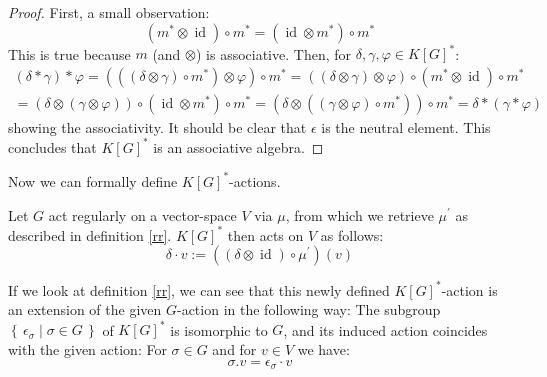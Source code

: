 \begin{proof}
  First, a small observation:
  \begin{equation}
    \left(m^\ast \otimes \operatorname{id} \right) \circ m^\ast = \left( \operatorname{id} \otimes m^\ast \right) \circ m^\ast
  \end{equation}
  This is true because $m$ (and $ \otimes $) is associative.
  Then, for $\delta, \gamma, \varphi \in K \left\lbrack G \right\rbrack^\ast$:
  \begin{equation}
    \begin{aligned}
      \left( \delta \ast \gamma \right) \ast \varphi
      = \left( \left( \left( \delta \otimes \gamma \right) \circ m^\ast \right) \otimes \varphi \right) \circ m^\ast
      = \left( (\delta \otimes \gamma) \otimes \varphi \right) \circ \left( m^\ast \otimes \operatorname{id} \right) \circ m^\ast \\
      = \left( \delta \otimes (\gamma \otimes \varphi) \right) \circ \left( \operatorname{id} \otimes m^\ast \right) \circ m^\ast
      = \left( \delta \otimes \left( \left( \gamma \otimes \varphi \right) \circ m^\ast \right) \right) \circ m^\ast
      = \delta \ast \left( \gamma \ast \varphi \right)
    \end{aligned}
  \end{equation}
  showing the associativity.
  It should be clear that $\epsilon$ is the neutral element.
  This concludes that $K \left\lbrack G \right\rbrack^\ast$ is an associative algebra.
\end{proof}

Now we can formally define $K [G]^\ast$-actions.

\begin{definition}\label{da}
  Let $G$ act regularly on a vector-space $V$ via $\mu$, from which we retrieve $\mu^\prime$ as described in definition \ref{rr}.  $K[G]^\ast$ then acts on $V$ as follows:
  \begin{equation}
    \delta \cdot v := \left(\left( \delta \otimes \operatorname{id} \right) \circ \mu^\prime \right) \left(v\right)
  \end{equation}
\end{definition}

\begin{remark}
  If we look at definition \ref{rr}, we can see that this newly defined $K[G]^\ast$-action is an extension of the given $G$-action in the following way:
  The subgroup $\left\{\, \epsilon_\sigma \mid \sigma \in G \,\right\}$ of $K[G]^\ast$ is isomorphic to $G$, and its induced action coincides with the given action:
  For $\sigma \in G$ and for $v \in V$ we have:
  \begin{equation}
    \sigma . v = \epsilon_\sigma \cdot v
  \end{equation}
\end{remark}

